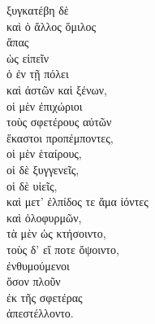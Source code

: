 {\large
\noindent ξυγκατέβη δὲ \\
καὶ ὁ ἄλλος ὅμιλος \\
\tabto{2em} ἅπας \\
\tabto{4em} ὡς εἰπεῖν \\
\tabto{2em} ὁ ἐν τῇ πόλει \\
\tabto{4em} καὶ ἀστῶν καὶ ξένων, \\
\tabto{4em} οἱ μὲν ἐπιχώριοι \\
\tabto{6em} τοὺς σφετέρους αὐτῶν \\
\tabto{4em} ἕκαστοι προπέμποντες, \\
\tabto{6em} οἱ μὲν ἑταίρους, \\
\tabto{6em} οἱ δὲ ξυγγενεῖς, \\
\tabto{6em} οἱ δὲ υἱεῖς, \\
\tabto{4em} καὶ μετ' ἐλπίδος τε ἅμα ἰόντες \\
\tabto{6em} καὶ ὀλοφυρμῶν, \\
\tabto{8em} τὰ μὲν ὡς κτήσοιντο, \\
\tabto{8em} τοὺς δ' εἴ ποτε ὄψοιντο, \\
\tabto{4em} ἐνθυμούμενοι \\
\tabto{6em} ὅσον πλοῦν \\
\tabto{8em} ἐκ τῆς σφετέρας \\
\tabto{4em} ἀπεστέλλοντο.\\

}

